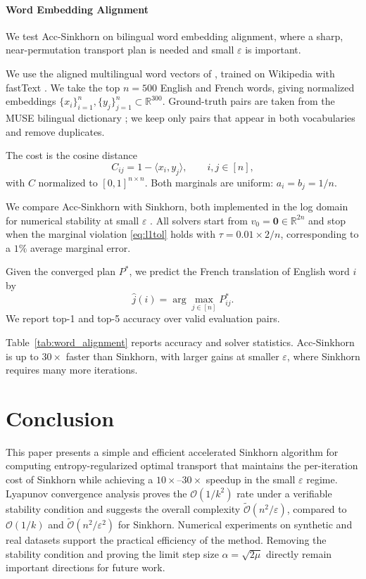 \documentclass{article}
\theoremstyle{plain}
\theoremstyle{remark}
\begin{document}
\paragraph{Word Embedding Alignment}
We test Acc-Sinkhorn on bilingual word embedding alignment, where a sharp, near-permutation transport plan is needed and small $\varepsilon$ is important.

We use the aligned multilingual word vectors of \citet{conneau2018word}, trained on Wikipedia with fastText \citep{bojanowski2017enriching}. We take the top $n=500$ English and French words, giving normalized embeddings $\{x_i\}_{i=1}^n,\{y_j\}_{j=1}^n\subset\mathbb{R}^{300}$. Ground-truth pairs are taken from the MUSE bilingual dictionary \citep{conneau2018word}; we keep only pairs that appear in both vocabularies and remove duplicates.

The cost is the cosine distance
\begin{equation}
C_{ij}=1-\langle x_i,y_j\rangle,\qquad i,j\in[n],
\end{equation}
with $C$ normalized to $[0,1]^{n\times n}$. Both marginals are uniform: $a_i=b_j=1/n$.

We compare Acc-Sinkhorn with Sinkhorn, both implemented in the log domain for numerical stability at small $\varepsilon$ \citep{chizat2016scaling}. All solvers start from $v_0=\mathbf{0}\in\mathbb{R}^{2n}$ and stop when the marginal violation \eqref{eq:l1tol} holds with $\tau=0.01\times 2/n$, corresponding to a $1\%$ average marginal error.

Given the converged plan $P^*$, we predict the French translation of English word $i$ by
\begin{equation}
\hat{j}(i)=\arg\max_{j\in[n]} P^*_{ij}.
\end{equation}
We report top-1 and top-5 accuracy over valid evaluation pairs.

Table~\ref{tab:word_alignment} reports accuracy and solver statistics. Acc-Sinkhorn is up to $30\times$ faster than Sinkhorn, with larger gains at smaller $\varepsilon$, where Sinkhorn requires many more iterations.

\section{Conclusion}
This paper presents a simple and efficient accelerated Sinkhorn algorithm for computing entropy-regularized optimal transport that maintains the per-iteration cost of Sinkhorn while achieving a $10\times$--$30\times$ speedup in the small $\varepsilon$ regime. Lyapunov convergence analysis proves the $\mathcal{O}(1/k^2)$ rate under a verifiable stability condition and suggests the overall complexity $\widetilde{\mathcal O}(n^2/\varepsilon)$, compared to $\mathcal{O}(1/k)$ and $\widetilde{\mathcal O}(n^2/\varepsilon^2)$ for Sinkhorn. Numerical experiments on synthetic and real datasets support the practical efficiency of the method. Removing the stability condition and proving the limit step size $\alpha=\sqrt{2\mu}$ directly remain important directions for future work.
\end{document}

